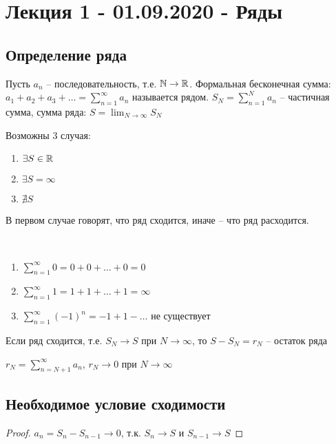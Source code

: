 \section{Лекция 1 - 01.09.2020 - Ряды}
\subsection{Определение ряда}
\begin{definition}
Пусть $a_{n}$ -- последовательность, т.е. $\mathbb{N} \rightarrow \mathbb{R}$. Формальная бесконечная сумма: $a_1 + a_2 + a_3 + \dots = \sum_{n=1}^{\infty} a_n$ называется рядом.
$S_N = \sum_{n = 1}^{N} a_n$ -- частичная сумма, сумма ряда: $S = \lim_{N \rightarrow \infty} S_N$
\end{definition}

Возможны 3 случая:
\begin{enumerate}
    \item $\exists S \in \mathbb{R}$
    \item $\exists S = \infty$
    \item $\nexists S$
\end{enumerate}

В первом случае говорят, что ряд сходится, иначе -- что ряд расходится.

\begin{example}~
    \begin{enumerate}
        \item $\sum_{n = 1}^{\infty} 0 = 0 + 0 + \dots + 0 = 0$
        \item $\sum_{n = 1}^{\infty} 1 = 1 + 1 + \dots + 1 = \infty$
        \item $\sum_{n = 1}^{\infty} (-1)^{n} = -1 + 1 - \dots$ не существует
    \end{enumerate}
\end{example}

\begin{definition}
    Если ряд сходится, т.е. $S_N \rightarrow S$ при $N \rightarrow \infty$, то $S - S_N = r_N$ -- остаток ряда

    $r_N = \sum_{n = N + 1}^{\infty} a_n$, $r_N \rightarrow 0$ при $N \rightarrow \infty$
\end{definition}

\subsection{Необходимое условие сходимости}
\begin{comment}~
    Если ряд сходится, то $a_n \rightarrow 0$
\end{comment}
\begin{proof}
    $a_n = S_n - S_{n - 1} \rightarrow 0$, т.к. $S_n \rightarrow S$ и $S_{n - 1} \rightarrow S$
\end{proof}
